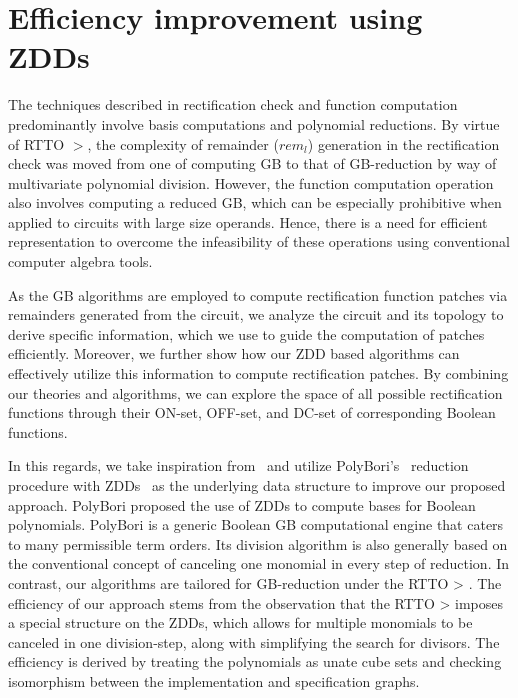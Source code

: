 \section{Efficiency improvement using ZDDs}\label{impl}

The techniques described in rectification check and function computation 
predominantly involve \Grobner basis computations and polynomial reductions.
By virtue of RTTO $>$, the complexity of remainder ($rem_l$) generation 
in the rectification check was moved from one of computing GB to that of 
GB-reduction by way of multivariate polynomial division. 
However, the function computation operation also involves computing
a reduced GB, which can be especially prohibitive when applied to circuits with
large size operands. Hence, there is a need for efficient representation 
to overcome the infeasibility of these operations using conventional 
computer algebra tools. 
 
 As the GB algorithms are employed to compute rectification function
patches via remainders generated from the circuit, we analyze the circuit and its 
topology to derive specific
information, which we use to guide the computation of patches efficiently. Moreover, we
further show how our ZDD based algorithms can effectively utilize this information
to compute rectification patches. By combining our theories and algorithms, we can explore
the space of all possible rectification functions through their ON-set, OFF-set, and DC-set
of corresponding Boolean functions.

In this regards, we take inspiration from~\cite{Utkarsh:TCAD19} and utilize 
PolyBori’s~\cite{pbori:JSC09} reduction procedure with 
ZDDs~\cite{Minato:DAC93,Minato:DAC94} as the underlying data structure 
to improve our proposed approach.
PolyBori proposed the use of ZDDs to compute
\Grobner bases for Boolean polynomials. PolyBori is a generic Boolean GB computational
engine that caters to many permissible term orders. Its division algorithm is also generally
based on the conventional concept of canceling one monomial in every step of reduction.
In contrast, our algorithms are tailored for GB-reduction under the RTTO > . The efficiency
of our approach stems from the observation that the RTTO > imposes a special structure
on the ZDDs, which allows for multiple monomials to be canceled in one division-step,
along with simplifying the search for divisors.
The efficiency is derived by treating the polynomials 
as unate cube sets and checking isomorphism between the implementation and specification 
graphs. 

